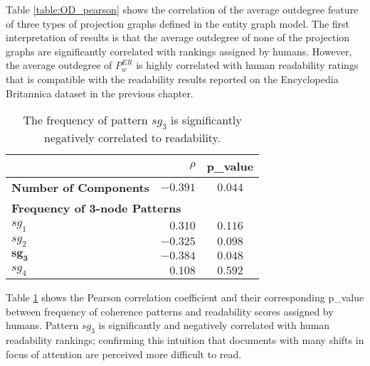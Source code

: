 Table \ref{table:OD_pearson} shows the correlation of the average outdegree feature of three types of projection graphs defined in the entity graph model. 
The first interpretation of results is that the average outdegree of none of the projection graphs are significantly correlated with rankings assigned by humans. 
However, the average outdegree of $P_w^{ER}$ is highly correlated with human readability ratings that is compatible with the readability results reported on the Encyclopedia Britannica dataset in the previous chapter. 



\begin{table}[!h]
\centering
\begin{small}
\begin{tabular}{lrc}
\hline
   & $\rho$ & p\_value\\\hline
\textbf{Number of Components} & $\mathbf{-0.391}$ & $\mathbf{0.044}$  \\\hline

\multicolumn{3}{l}{\textbf{Frequency of 3-node Patterns}} \\
 $sg_1$ &  $0.310$ & $0.116$\\
 $sg_2$ & $-0.325$ & $0.098$\\
$\mathbf{sg_3}$ & $\mathbf{-0.384}$ & $\mathbf{0.048}$\\
 $sg_4$ &  $0.108$ & $0.592$\\\hline
\end{tabular}
\end{small}
\caption{The frequency of pattern $sg_3$ is significantly negatively correlated to readability.}
 \label{table:3node_pearson}
\end{table}

Table \ref{table:3node_pearson} shows the Pearson correlation coefficient and their corresponding p\_value between frequency of coherence patterns and readability scores assigned by humans. 
Pattern $sg_3$ is significantly and negatively correlated with human readability rankings;  confirming this intuition that documents with many shifts in focus of attention are perceived more difficult to read. 

